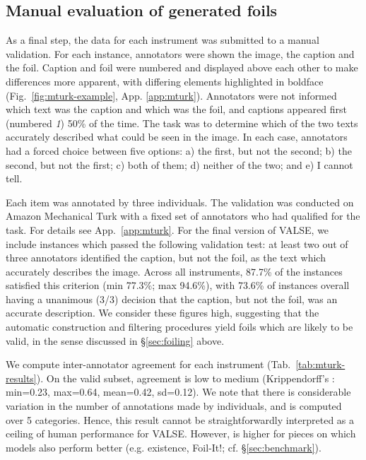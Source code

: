 \documentclass[11pt]{article}
\newcommand{\dataset}{VALSE}
\begin{document}
\subsection{Manual evaluation of generated foils}\label{sec:mturk}
As a final step, the data for each instrument was submitted to a manual validation.
For each instance, annotators were shown the image, the caption and the foil. Caption and foil were numbered and displayed above each other to make differences more apparent, 
with differing elements highlighted in boldface (Fig.\ \ref{fig:mturk-example}, App. \ref{app:mturk}).
Annotators were not informed which text was the caption and which was the foil, and captions appeared first (numbered {\em 1}) 50\% of the time. The task was to determine which of the two texts accurately described what could be seen in the image. In each case, annotators had a forced choice between five options: a) the first, but not the second; b) the second, but not the first; c) both of them; d) neither of the two; and e) I cannot tell.

Each item was annotated by three individuals. The validation was conducted on Amazon Mechanical Turk with a fixed set of annotators who had qualified for the task.
For details see  App.\ \ref{app:mturk}.
For the final version of \dataset{}, we include instances which passed the following validation test: 
at least two out of three annotators identified the caption, but not the foil, as the text which accurately describes the image. Across all instruments, 87.7\% of the instances satisfied this criterion (min 77.3\%; max 94.6\%),
with 73.6\% of instances overall having a unanimous (3/3) decision that the caption, but not the foil, was an accurate description. We consider these figures high, suggesting that the automatic construction and filtering procedures yield foils which are likely to be valid, in the sense discussed in \S\ref{sec:foiling} above. 

We compute inter-annotator agreement for each instrument (Tab.~\ref{tab:mturk-results}). On the valid subset, agreement is low to medium (Krippendorff's : min=0.23, max=0.64, mean=0.42, sd=0.12). We note that there is considerable variation in the number of annotations made by individuals, and  is computed over 5 categories. Hence, this result cannot be straightforwardly interpreted as a ceiling of human performance for \dataset{}. However,  is higher for pieces on which models also perform better (e.g. existence, Foil-It!; cf. \S \ref{sec:benchmark}).
\end{document}
